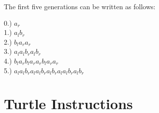 \begin{flushleft}
\vspace{5mm}

The first five generations can be written as follows: \\

\vspace{5mm}

0.) $a_r$ \\
1.) $a_l b_r$ \\
2.) $b_l a_r a_r$ \\
3.) $a_l a_l b_r a_l b_r$ \\
4.) $b_l a_r b_l a_r a_r b_l a_r a_r$ \\
5.) $a_l a_l b_r a_l a_l b_r a_l b_r a_l a_l b_r a_l b_r$ \\

\vspace{5mm}



\end{flushleft}

\section{Turtle Instructions} \label{turtle instructions}

